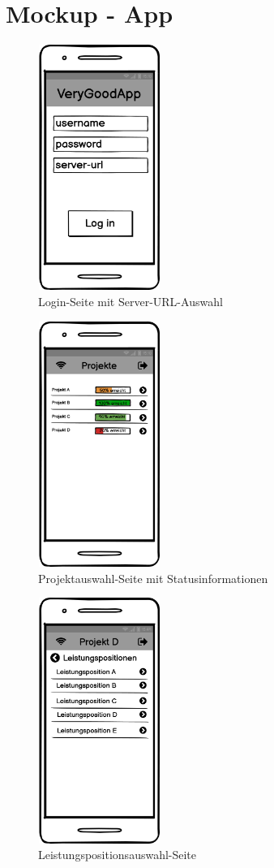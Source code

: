 
\section{Mockup - App}

\begin{figure}[ht]
	\centering
	\includegraphics[width=4cm, height=8cm]{img/mockup-app/Login-screen.png}
	\caption{Login-Seite mit Server-URL-Auswahl}
\end{figure}

\begin{figure}[ht]
	\centering
	\includegraphics[width=4cm, height=8cm]{img/mockup-app/Projekte_Auswahl.png}
	\caption{Projektauswahl-Seite mit Statusinformationen}
\end{figure}

\begin{figure}[ht]
	\centering
	\includegraphics[width=4cm, height=8cm]{img/mockup-app/Leistungspositionen_Auswahl.png}
	\caption{Leistungspositionsauswahl-Seite}
\end{figure}

